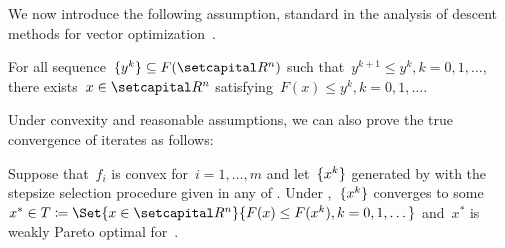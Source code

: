\documentclass[../main]{subfiles}
\begin{document}
We now introduce the following assumption, standard in the analysis of descent methods for vector optimization~\cite{Fliege2000,Grana-Drummond2004,Fukuda2011}.
\begin{assumption} 
    For all sequence~$\set{y^k} \subseteq F(\setR^n)$ such that~$y^{k + 1} \le y^k, k = 0, 1, \dots$, there exists~$x \in \setR^n$ satisfying~$F(x) \le y^k, k = 0, 1, \dots$.
\end{assumption}
Under convexity and reasonable assumptions, we can also prove the true convergence of iterates as follows:
\begin{theorem} 
    Suppose that~$f_i$ is convex for~$i = 1, \dots, m$ and let~$\lbrace x^k\rbrace$ generated by  with the stepsize selection procedure given in any of .
    Under ,~$\lbrace x^k\rbrace$ converges to some~$x^* \in T \coloneqq \Set{x \in \setR^n}{F(x) \le F(x^k), k = 0, 1, \dots}$ and~$x^*$ is weakly Pareto optimal for~.
\end{theorem}
\end{document}
